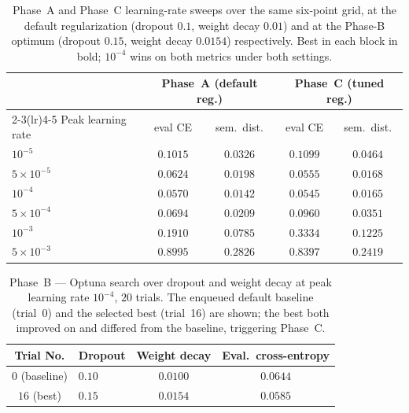 \documentclass[titlepage,a4paper,11pt]{report}
\begin{document}
    \begin{table}[ht]
        \centering
        \caption{Phase~A and Phase~C learning-rate sweeps over the same six-point grid, at the default regularization (dropout $0.1$, weight decay $0.01$) and at the Phase-B optimum (dropout $0.15$, weight decay $0.0154$) respectively. Best in each block in bold; $10^{-4}$ wins on both metrics under both settings.}
        \label{tab:hpo_lr_grid}
        \begin{tabular}{lcccc}
            \toprule
            & \multicolumn{2}{c}{Phase~A (default reg.)} & \multicolumn{2}{c}{Phase~C (tuned reg.)} \\
            \cmidrule(lr){2-3}\cmidrule(lr){4-5}
            Peak learning rate & eval CE & sem.\ dist. & eval CE & sem.\ dist. \\
            \midrule
            $10^{-5}$        & $0.1015$          & $0.0326$          & $0.1099$          & $0.0464$ \\
            $5\times10^{-5}$ & $0.0624$          & $0.0198$          & $0.0555$          & $0.0168$ \\
            $10^{-4}$        & $\mathbf{0.0570}$ & $\mathbf{0.0142}$ & $\mathbf{0.0545}$ & $\mathbf{0.0165}$ \\
            $5\times10^{-4}$ & $0.0694$          & $0.0209$          & $0.0960$          & $0.0351$ \\
            $10^{-3}$        & $0.1910$          & $0.0785$          & $0.3334$          & $0.1225$ \\
            $5\times10^{-3}$ & $0.8995$          & $0.2826$          & $0.8397$          & $0.2419$ \\
            \bottomrule
        \end{tabular}
    \end{table}

    \begin{table}[ht]
        \centering
        \caption{Phase~B --- Optuna search over dropout and weight decay at peak learning rate $10^{-4}$, $20$ trials. The enqueued default baseline (trial~0) and the selected best (trial~16) are shown; the best both improved on and differed from the baseline, triggering Phase~C.}
        \label{tab:hpo_phase_b}
        \begin{tabular}{clcc}
            \toprule
            Trial No. & Dropout & Weight decay & Eval.\ cross-entropy \\
            \midrule
            $0$ (baseline) & $0.10$ & $0.0100$ & $0.0644$ \\
            $16$ (best)    & $0.15$ & $0.0154$ & $\mathbf{0.0585}$ \\
            \bottomrule
        \end{tabular}
    \end{table}
\end{document}
